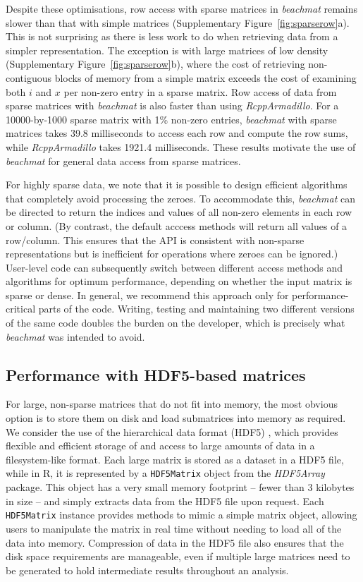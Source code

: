 \documentclass{article}
\newcommand{\beachmat}{\textit{beachmat}}
\newcommand{\code}[1]{\texttt{#1}}
\begin{document}
Despite these optimisations, row access with sparse matrices in \beachmat{} remains slower than that with simple matrices (Supplementary Figure~\ref{fig:sparserow}a).
This is not surprising as there is less work to do when retrieving data from a simpler representation.
The exception is with large matrices of low density (Supplementary Figure~\ref{fig:sparserow}b), where the cost of retrieving non-contiguous blocks of memory from a simple matrix exceeds the cost of examining both $i$ and $x$ per non-zero entry in a sparse matrix.
Row access of data from sparse matrices with \beachmat{} is also faster than using \textit{RcppArmadillo}.
For a 10000-by-1000 sparse matrix with 1\% non-zero entries, \beachmat{} with sparse matrices takes 39.8 milliseconds to access each row and compute the row sums, while \textit{RcppArmadillo} takes 1921.4 milliseconds.
These results motivate the use of \beachmat{} for general data access from sparse matrices.

For highly sparse data, we note that it is possible to design efficient algorithms that completely avoid processing the zeroes.
To accommodate this, \beachmat{} can be directed to return the indices and values of all non-zero elements in each row or column.
(By contrast, the default acccess methods will return all values of a row/column.
This ensures that the API is consistent with non-sparse representations but is inefficient for operations where zeroes can be ignored.)
User-level code can subsequently switch between different access methods and algorithms for optimum performance, depending on whether the input matrix is sparse or dense.
In general, we recommend this approach only for performance-critical parts of the code.
Writing, testing and maintaining two different versions of the same code doubles the burden on the developer, which is precisely what \beachmat{} was intended to avoid.

\subsection{Performance with HDF5-based matrices}
For large, non-sparse matrices that do not fit into memory, the most obvious option is to store them on disk and load submatrices into memory as required.
We consider the use of the hierarchical data format (HDF5) \cite{hdf5}, which provides flexible and efficient storage of and access to large amounts of data in a filesystem-like format.
Each large matrix is stored as a dataset in a HDF5 file, while in R, it is represented by a \code{HDF5Matrix} object from the \textit{HDF5Array} package.
This object has a very small memory footprint -- fewer than 3 kilobytes in size -- and simply extracts data from the HDF5 file upon request.
Each \code{HDF5Matrix} instance provides methods to mimic a simple matrix object, allowing users to manipulate the matrix in real time without needing to load all of the data into memory.
Compression of data in the HDF5 file also ensures that the disk space requirements are manageable, even if multiple large matrices need to be generated to hold intermediate results throughout an analysis.
\end{document}
